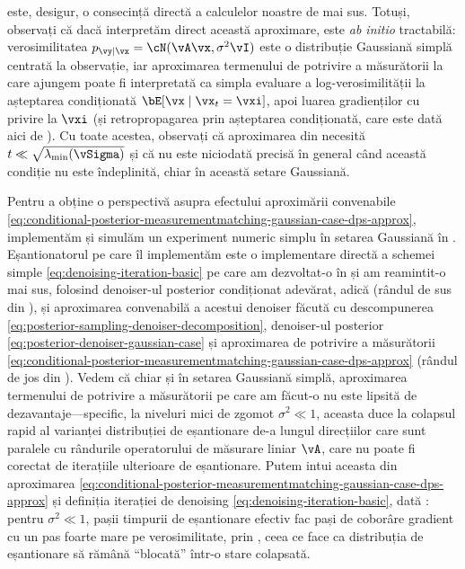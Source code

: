 \documentclass[../../book-main_ro.tex]{subfiles}
\begin{document}
\begin{example}
  este, desigur, o consecință directă a calculelor noastre de mai sus. Totuși, observați
  că dacă interpretăm direct această aproximare, este \textit{ab initio}
  tractabilă: verosimilitatea $p_{\vy \mid \vx} = \cN(\vA\vx, \sigma^2 \vI)$ este
  o distribuție Gaussiană simplă centrată la observație, iar
  aproximarea termenului de potrivire a măsurătorii la care ajungem poate fi
  interpretată ca simpla evaluare a log-verosimilității la așteptarea
  condiționată $\bE[\vx \mid \vx_t = \vxi]$, apoi luarea gradienților cu privire
  la $\vxi$ (și retropropagarea prin așteptarea condiționată, care este
  dată aici de ).
  Cu toate acestea, observați că aproximarea din
  necesită $t \ll \sqrt{\lambda_{\min}(\vSigma)}$ și că nu este niciodată precisă
  în general când această condiție nu este îndeplinită, chiar în această setare Gaussiană.

  Pentru a obține o perspectivă asupra efectului aproximării convenabile
  \eqref{eq:conditional-posterior-measurementmatching-gaussian-case-dps-approx},
  implementăm și simulăm un experiment numeric simplu în
  setarea Gaussiană în . 
  Eșantionatorul pe care îl implementăm este o implementare directă a schemei simple
  \eqref{eq:denoising-iteration-basic} pe care am dezvoltat-o în 
  și am reamintit-o mai sus, folosind denoiser-ul posterior condiționat adevărat, adică
   (rândul de sus din
  ), și 
  aproximarea convenabilă a acestui denoiser făcută cu descompunerea
  \eqref{eq:posterior-sampling-denoiser-decomposition}, denoiser-ul posterior
  \eqref{eq:posterior-denoiser-gaussian-case} și aproximarea de
  potrivire a măsurătorii
  \eqref{eq:conditional-posterior-measurementmatching-gaussian-case-dps-approx}
  (rândul de jos din ).
  Vedem că chiar și în setarea Gaussiană simplă, aproximarea termenului de
  potrivire a măsurătorii pe care am făcut-o nu este lipsită de
  dezavantaje---specific, la niveluri mici de zgomot $\sigma^2 \ll 1$, aceasta duce la
  colapsul rapid al varianței distribuției de eșantionare de-a lungul direcțiilor
  care sunt paralele cu rândurile operatorului de măsurare liniar $\vA$, care
  nu poate fi corectat de iterațiile ulterioare de eșantionare. Putem intui aceasta din
  aproximarea
  \eqref{eq:conditional-posterior-measurementmatching-gaussian-case-dps-approx}
  și definiția iterației de denoising
  \eqref{eq:denoising-iteration-basic}, dată
  : pentru $\sigma^2 \ll 1$,
  pașii timpurii de eșantionare efectiv fac pași de coborâre gradient cu un
  pas foarte mare pe verosimilitate, prin
  ,
  ceea ce face ca distribuția de eșantionare să rămână ``blocată'' într-o stare colapsată.

\end{example}
\end{document}
